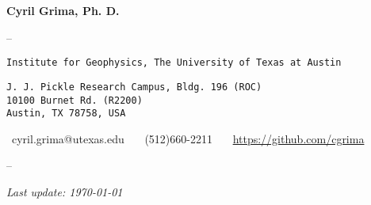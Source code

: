 \begin{center}

{\LARGE \textbf{Cyril Grima, Ph. D.}}
\vspace{.5em}

\hspace{0pt}{\large Assistant Research Professor}

--

\noindent\hspace{0pt}\texttt{Institute for Geophysics, The University of Texas at Austin}

\noindent\hspace{0pt}\texttt{J. J. Pickle Research Campus, Bldg. 196 (ROC) \\
10100 Burnet Rd. (R2200) \\
Austin, TX 78758, USA}
\vspace{.5em}

\noindent\hspace{0pt}\faInbox \ cyril.grima@utexas.edu \ \ \faPhone \ (512)660-2211 
\ \ \faGithub \ \href{https://github.com/cgrima}{https://github.com/cgrima}

--

\textit{Last update: \today}

\end{center}
\vspace{-1em}